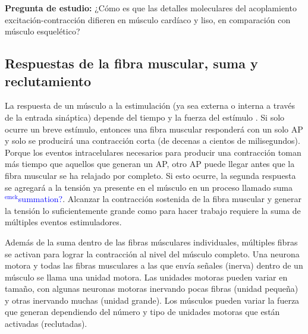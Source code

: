 \documentclass[12pt]{article}
\newcommand{\emck}[1]{\textcolor{blue}{$^{\textrm{emck}}${#1}}}
\begin{document}
\textbf{Pregunta de estudio:} ¿Cómo es que las detalles moleculares
del acoplamiento excitación-contracción difieren en músculo
cardíaco y liso, en comparación con músculo esquelético?

\subsection*{Respuestas de la fibra muscular, suma y reclutamiento}

La respuesta de un músculo a la estimulación (ya sea externa o interna
a través de la entrada sináptica) depende del tiempo y la fuerza del
estímulo \cite{openStax2016nervous}. Si solo ocurre un breve estímulo,
entonces una fibra muscular responderá con un solo AP y solo se
producirá una contracción corta (de decenas a cientos de
milisegundos). Porque los eventos intracelulares necesarios para
producir una contracción toman más tiempo que aquellos que generan un
AP, otro AP puede llegar antes que la fibra muscular se ha relajado
por completo. Si esto ocurre, la segunda respuesta se agregará a la
tensión ya presente en el músculo en un proceso llamado suma
\emck{summation?}. Alcanzar la contracción sostenida de la fibra
muscular y generar la tensión lo suficientemente grande como para
hacer trabajo requiere la suma de múltiples eventos estimuladores.

Además de la suma dentro de las fibras músculares individuales,
múltiples fibras se activan para lograr la contracción al nivel del
músculo completo. Una neurona motora y todas las fibras musculares a
las que envía señales (inerva) dentro de un músculo se llama una
unidad motora. Las unidades motoras pueden variar en tamaño, con
algunas neuronas motoras inervando pocas fibras (unidad pequeña) y
otras inervando muchas (unidad grande). Los músculos pueden variar
la fuerza que generan dependiendo del número y tipo de unidades
motoras que están activadas (reclutadas).

\vspace{0.2cm}
\end{document}
